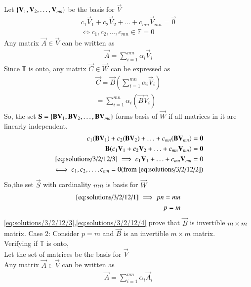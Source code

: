 Let $\cbrak{\vec{V}_1,\vec{V}_2,\hdots,\vec{V}_{mn}}$ be the basis for $\vec{V}$
\begin{align}
    c_1\vec{V}_1+ c_2\vec{V}_2+\hdots+ c_{mn}\vec{V}_{mn}=\vec{0}\\
    \iff c_1,c_2,\hdots,c_{mn} \in \mathbb{F}=0\label{eq:solutions/3/2/12/2}
\end{align}
Any matrix $\vec{A} \in \vec{V}$ can be written as
\begin{align}
 \vec{A}= \sum_{i=1}^{mn} \alpha_i\vec{V}_i  
\end{align}
Since $\mathbb{T}$ is onto, any matrix $\vec{C} \in \vec{W}$ can be expressed as 
\begin{align}
    \vec{C}=\vec{B}\left( \sum_{i=1}^{mn} \alpha_i\vec{V}_i\right)\\
    =\sum_{i=1}^{mn} \alpha_i(\vec{B}\vec{V}_i)
\end{align}
So, the set $\vec{S}=\cbrak{\vec{B}\vec{V}_1,\vec{B}\vec{V}_2,\hdots,\vec{B}\vec{V}_{mn}}$ forms basis of $\vec{W}$ if all matrices in it are linearly independent.
\begin{align}
    c_1(\vec{B}\vec{V}_1)+ c_2(\vec{B}\vec{V}_2)+\hdots+ c_{mn}(\vec{B}\vec{V}_{mn})=\vec{0}\\
     \vec{B}( c_1\vec{V}_1+ c_2\vec{V}_2+\hdots+ c_{mn}\vec{V}_{mn})=\vec{0}\\
    \eqref{eq:solutions/3/2/12/3} \implies c_1\vec{V}_1+\hdots+ c_{mn}\vec{V}_{mn}=0\\
    \iff c_1,c_2,\hdots,c_{mn}=0 (\text{from \eqref{eq:solutions/3/2/12/2}})
\end{align}
So,the set $\vec{S}$ with cardinality $mn$ is basis for $\vec{W}$ 
\begin{align}
   \eqref{eq:solutions/3/2/12/1} \implies pn=mn\\
    p=m\label{eq:solutions/3/2/12/4}
\end{align}
\eqref{eq:solutions/3/2/12/3},\eqref{eq:solutions/3/2/12/4} prove that $\vec{B}$ is invertible $m \times m$ matrix.
{Case 2: }
 Consider $p=m$ and $\vec{B}$ is an invertible $m \times m$ matrix.\\
Verifying if $\mathbb{T}$ is onto,\\
Let the set of matrices  be the basis for $\vec{V}$\\
Any matrix $\vec{A} \in \vec{V}$ can be written as
\begin{align}
   \vec{A}= \sum_{i=1}^{mn} \alpha_i\vec{A}_i\label{eq:solutions/3/2/12/5}
\end{align}
